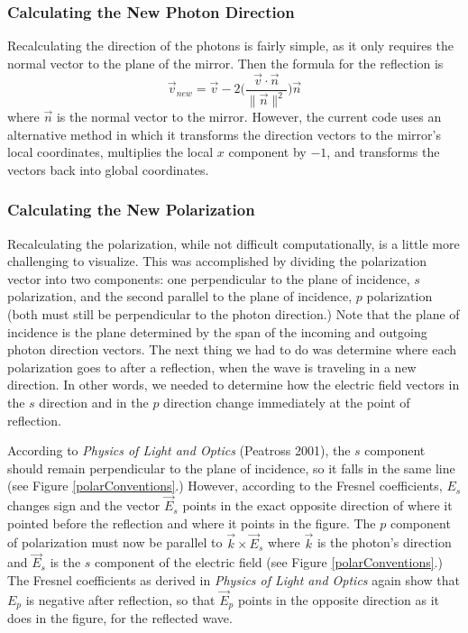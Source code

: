 \documentclass[manuscript]{aastex}
\begin{document}
\subsubsection{Calculating the New Photon Direction}

Recalculating the direction of the photons is fairly simple, as it only requires the normal vector to the plane of the mirror. Then the formula for the reflection is
\begin{equation}
\label{reflection}
\vec{v}_{new}=\vec{v} - 2 \Big(\frac {\vec{v}\cdot\vec{n}} {\|\vec{n}\|^2} \Big) \vec{n}
\end{equation}
where $\vec{n}$ is the normal vector to the mirror. However, the current code uses an alternative method in which it transforms the direction vectors to the mirror's local coordinates, multiplies the local $x$ component by $-1$, and transforms the vectors back into global coordinates.

\subsubsection{Calculating the New Polarization}

Recalculating the polarization, while not difficult computationally, is a little more challenging to visualize. This was accomplished by dividing the polarization vector into two components: one perpendicular to the plane of incidence, $s$ polarization, and the second parallel to the plane of incidence, $p$ polarization (both must still be perpendicular to the photon direction.) Note that the plane of incidence is the plane determined by the span of the incoming and outgoing photon direction vectors. The next thing we had to do was determine where each polarization goes to after a reflection, when the wave is traveling in a new direction. In other words, we needed to determine how the electric field vectors in the $s$ direction and in the $p$ direction change immediately at the point of reflection.

According to \textit{Physics of Light and Optics} (Peatross 2001), the $s$ component should remain perpendicular to the plane of incidence, so it falls in the same line (see Figure \ref{polarConventions}.) However, according to the Fresnel coefficients, $E_s$ changes sign and the vector $\vec{E}_s$ points in the exact opposite direction of where it pointed before the reflection and where it points in the figure. The $p$ component of polarization must now be parallel to $\vec{k}\times\vec{E}_s$ where $\vec{k}$ is the photon's direction and $\vec{E}_s$ is the $s$ component of the electric field (see Figure \ref{polarConventions}.) The Fresnel coefficients as derived in \textit{Physics of Light and Optics} again show that $E_p$ is negative after reflection, so that $\vec{E}_p$ points in the opposite direction as it does in the figure, for the reflected wave.
\end{document}
